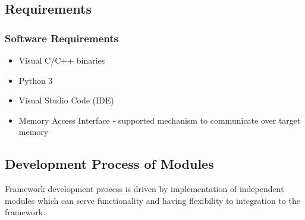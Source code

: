 \subsection{Requirements}\label{subsection-requirements}
\subsubsection{Software Requirements}
\begin{itemize}
	\item Visual C/C++ binaries
	\item Python 3
	\item Visual Studio Code (IDE)
	\item Memory Access Interface - supported mechanism to communicate over target memory
\end{itemize}

\subsection{Development Process of Modules}
Framework development process is driven by implementation of independent modules which can serve functionality and having flexibility to integration to the framework.



